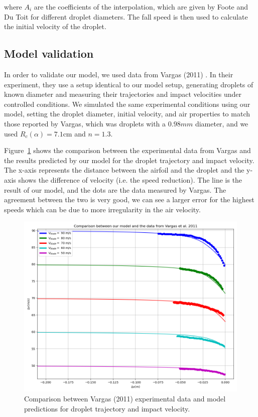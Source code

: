 \documentclass[10pt]{report}
\begin{document}
where $A_i$ are the coefficients of the interpolation, which are given by Foote and Du Toit \cite{foote1969terminal} for different droplet diameters. The fall speed is then used to calculate the initial velocity of the droplet.

\subsection*{Model validation}
\par In order to validate our model, we used data from Vargas (2011) \cite{Vargas2010}. In their experiment, they use a setup identical to our model setup, generating droplets of known diameter and measuring their trajectories and impact velocities under controlled conditions. We simulated the same experimental conditions using our model, setting the droplet diameter, initial velocity, and air properties to match those reported by Vargas, which was droplets with a $0.98mm$ diameter, and we used $R_c(\alpha) = 7.1 \mathrm{cm}$ and $n=1.3$.
\vspace{5mm}
\par Figure~\ref{fig:vargas_comparison} shows the comparison between the experimental data from Vargas and the results predicted by our model for the droplet trajectory and impact velocity. The x-axis represents the distance between the airfoil and the droplet and the y-axis shows the difference of velocity (i.e. the speed reduction). The line is the result of our model, and the dots are the data measured by Vargas. The agreement between the two is very good, we can see a larger error for the highest speeds which can be due to more irregularity in the air velocity.
\begin{figure}[H]
    \centering
    \includegraphics[width=1\textwidth]{figures/comp_vargas.png}
    \caption{Comparison between Vargas (2011) experimental data and model predictions for droplet trajectory and impact velocity.}
    \label{fig:vargas_comparison}
\end{figure}
\end{document}
